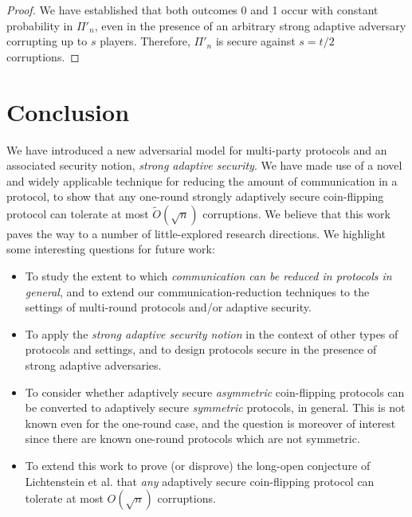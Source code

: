 \documentclass[11pt,letterpaper]{article}
\theoremstyle{plain}
\theoremstyle{definition}
\begin{document}
\begin{proof}
We have established that both outcomes 0 and 1 occur with constant probability in $\Pi'_n$, even in the presence of 
an arbitrary strong adaptive adversary corrupting up to $s$ players. 
Therefore, $\Pi'_n$ is secure against $s=t/2$ corruptions.
\end{proof}



\section{Conclusion}

We have introduced a new adversarial model for multi-party protocols and an associated security notion, \emph{strong adaptive security}.
We have made use of a novel and widely applicable technique for reducing the amount of communication in a protocol,
to show that any one-round strongly adaptively secure coin-flipping protocol can tolerate at most $\widetilde{O}(\sqrt n)$ corruptions.
We believe that this work paves the way to a number of little-explored research directions.
We highlight some interesting questions for future work:

\begin{itemize}
\item To study the extent to which \emph{communication can be reduced in protocols in general}, and to extend our communication-reduction techniques to
the settings of multi-round protocols and/or adaptive security.
\item To apply the \emph{strong adaptive security notion} in the context of other types of protocols and settings, 
and to design protocols secure in the presence of strong adaptive adversaries.
\item To consider whether adaptively secure \emph{asymmetric} coin-flipping protocols can be converted to adaptively secure \emph{symmetric} protocols, in general. This is not known even for the one-round case, and the question is moreover of interest since there are known one-round protocols which are not symmetric.
\item To extend this work to prove (or disprove) the long-open conjecture of Lichtenstein et al. \cite{LLS89} that \emph{any} adaptively secure coin-flipping protocol
can tolerate at most $O(\sqrt n)$ corruptions. 
\end{itemize}

\printbibliography
\end{document}

